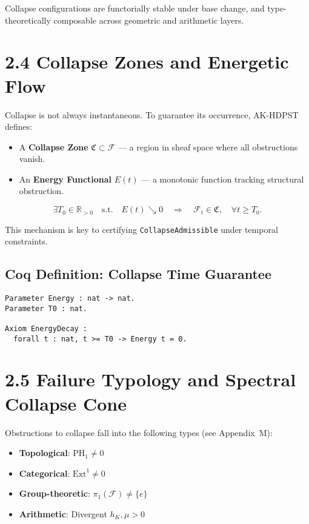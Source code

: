 \documentclass[11pt]{article}
\begin{document}
Collapse configurations are functorially stable under base change, and type-theoretically composable across geometric and arithmetic layers.

\section*{2.4 Collapse Zones and Energetic Flow}

Collapse is not always instantaneous. To guarantee its occurrence, AK-HDPST defines:

\begin{itemize}
  \item A \textbf{Collapse Zone} \( \mathfrak{C} \subset \mathcal{F} \) — a region in sheaf space where all obstructions vanish.
  \item An \textbf{Energy Functional} \( E(t) \) — a monotonic function tracking structural obstruction.
\end{itemize}

\[
\exists T_0 \in \mathbb{R}_{>0} \quad \text{s.t.} \quad E(t) \searrow 0 \quad \Rightarrow \quad \mathcal{F}_t \in \mathfrak{C}, \quad \forall t \geq T_0.
\]

This mechanism is key to certifying \texttt{CollapseAdmissible} under temporal constraints.

\subsection*{Coq Definition: Collapse Time Guarantee}

\begin{lstlisting}[language=Coq, caption=Collapse Time Guarantee]
Parameter Energy : nat -> nat.
Parameter T0 : nat.

Axiom EnergyDecay :
  forall t : nat, t >= T0 -> Energy t = 0.
\end{lstlisting}

\section*{2.5 Failure Typology and Spectral Collapse Cone}

Obstructions to collapse fall into the following types (see Appendix~M):

\begin{itemize}
  \item \textbf{Topological}: \( \mathrm{PH}_1 \neq 0 \)
  \item \textbf{Categorical}: \( \mathrm{Ext}^1 \neq 0 \)
  \item \textbf{Group-theoretic}: \( \pi_1(\mathcal{F}) \neq \{e\} \)
  \item \textbf{Arithmetic}: Divergent \( h_K, \mu > 0 \)
\end{itemize}
\end{document}
